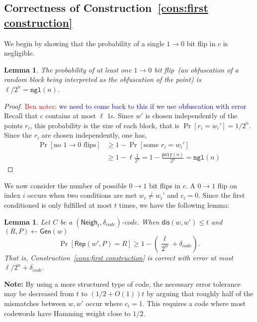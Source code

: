 \documentclass[11pt]{article}
\newcommand{\consref}[1]{\mbox{Construction~\ref{#1}}}
\newcommand{\class}[1]{{\ensuremath{\mathsf{#1}}}}
\newcommand{\gen}{\ensuremath{\class{Gen}}\xspace}
\newcommand{\rep}{\ensuremath{\class{Rep}}\xspace}
\newcommand{\neigh}{\ensuremath{\class{Neigh}}\xspace}
\newcommand{\dis}{\ensuremath{\mathsf{dis}}}
\newcommand{\poly}{\ensuremath{\mathtt{poly}}\xspace}
\newcommand{\ngl}{\ensuremath{\mathtt{ngl}}\xspace}
\newtheorem{lemma}[theorem]{Lemma}
\newcommand{\authnote}[2]{{\textcolor{red}{\textsf{#1 notes: }\textcolor{blue}{ #2}}\marginpar{\textcolor{red}{\textbf{!!!!!}}}}}
\newcommand{\authnote}[2]{}
\newcommand{\bnote}[1]{{\authnote{Ben}{#1}}}
\begin{document}
\subsection{Correctness of \consref{cons:first construction}}
We begin by showing that the probability of a single $1\rightarrow 0$ bit flip in $c$ is negligible.
\begin{lemma}
\label{lem:no 1 to 0 flips}
The probability of at least one $1\rightarrow 0$ bit flip~(an obfuscation of a random block being interpreted as the obfuscation of the point) is $ \ell/2^n = \ngl(n)$.
\end{lemma}
\begin{proof}
\bnote{we need to come back to this if we use obfuscation with error}
Recall that $c$ contains at most $\ell$ $1$s.  Since $w'$ is chosen independently of the points $r_i$, this probability is the size of each block, that is $\Pr[r_i =w_i']  = 1/2^n$. Since the $r_i$ are chosen independently, one has,
\begin{align*}
\Pr[\text{no $1\rightarrow 0$ flips}] &\geq 1-\Pr[\text{some }r_i = w_i']\\
&\geq 1-\ell \frac{1}{2^n} = 1-\frac{\poly(n)}{2^n} = \ngl(n)
\end{align*}
\end{proof}

We now consider the number of possible $0\rightarrow 1$ bit flips in $c$.  A $0\rightarrow 1$ flip on index $i$ occurs when two conditions are met $w_i\neq w_i'$ and $c_i = 0$.  Since the first conditioned is only fulfilled at most $t$ times, we have the following lemma:

\begin{lemma}
\label{lem:correct of cons}
Let $C$ be a $(\neigh_t, \delta_{code})$-code.  When $\dis(w, w')\leq t$ and $(R, P)\leftarrow \gen(w)$
\[
\Pr[\rep( w', P) = R] \geq 1-\left(\frac{\ell}{2^n}+\delta_{code}\right).
\]
That is, \consref{cons:first construction} is correct with error at most $\ell/2^n+\delta_{code}$.
\end{lemma}

\textbf{Note: }By using a more structured type of code, the necessary error tolerance may be decreased from $t$ to  $(1/2+O(1))t$ by arguing that roughly half of the mismatches between $w, w'$ occur where $c_i =1$.  This requires a code where most codewords have Hamming weight close to $1/2$.
\end{document}
